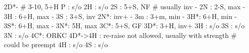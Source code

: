 2D*- # 3-10, 5+H
P  : s/o
2H : s/o
2S : 5+S, NF  # usually inv
   - 2N : 2-S, max
   - 3H : 6+H, max
   - 3S : 3+S, inv
2N*: inv+
   - 3m : 3+m, min
   - 3H*: 6+H, min
   - 3S*: 6+H, max
   - 3N*: 5H, max
3C*: 5+S, GF
3D*: 3+H, inv+
3H : s/o
3S : s/o
3N : s/o
4C*: ORKC
4D*->4H : re-raise not allowed, usually with strength  # could be preempt
4H : s/o
4S : s/o
